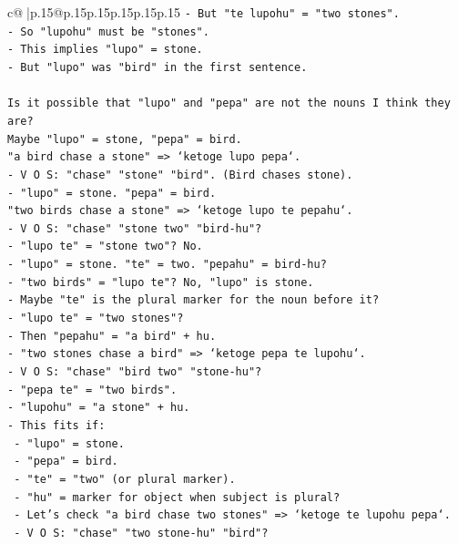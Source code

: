 \documentclass{article}
\begin{document}
{\begin{supertabular}{c@{$\;$}|p{.15\linewidth}@{}p{.15\linewidth}p{.15\linewidth}p{.15\linewidth}p{.15\linewidth}p{.15\linewidth}}
{{{\texttt{{-} But "te lupohu" = "two stones".} \\
\texttt{{-} So "lupohu" must be "stones".} \\
\texttt{{-} This implies "lupo" = stone.} \\
\texttt{{-} But "lupo" was "bird" in the first sentence.} \\
\\ 
\texttt{Is it possible that "lupo" and "pepa" are not the nouns I think they are?} \\
\texttt{Maybe "lupo" = stone, "pepa" = bird.} \\
\texttt{"a bird chase a stone" => `ketoge lupo pepa`.} \\
\texttt{{-} V O S: "chase" "stone" "bird". (Bird chases stone).} \\
\texttt{{-} "lupo" = stone. "pepa" = bird.} \\
\texttt{"two birds chase a stone" => `ketoge lupo te pepahu`.} \\
\texttt{{-} V O S: "chase" "stone two" "bird{-}hu"?} \\
\texttt{{-} "lupo te" = "stone two"? No.} \\
\texttt{{-} "lupo" = stone. "te" = two. "pepahu" = bird{-}hu?} \\
\texttt{{-} "two birds" = "lupo te"? No, "lupo" is stone.} \\
\texttt{{-} Maybe "te" is the plural marker for the noun before it?} \\
\texttt{{-} "lupo te" = "two stones"?} \\
\texttt{{-} Then "pepahu" = "a bird" + hu.} \\
\texttt{{-} "two stones chase a bird" => `ketoge pepa te lupohu`.} \\
\texttt{{-} V O S: "chase" "bird two" "stone{-}hu"?} \\
\texttt{{-} "pepa te" = "two birds".} \\
\texttt{{-} "lupohu" = "a stone" + hu.} \\
\texttt{{-} This fits if:} \\
\texttt{  {-} "lupo" = stone.} \\
\texttt{  {-} "pepa" = bird.} \\
\texttt{  {-} "te" = "two" (or plural marker).} \\
\texttt{  {-} "hu" = marker for object when subject is plural?} \\
\texttt{  {-} Let's check "a bird chase two stones" => `ketoge te lupohu pepa`.} \\
\texttt{    {-} V O S: "chase" "two stone{-}hu" "bird"?} \\
}}}
\end{supertabular}}
\end{document}
